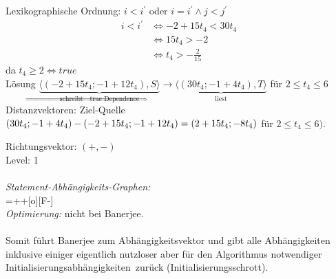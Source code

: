 Lexikographische Ordnung: $i < i^\prime$ oder $i = i^\prime \land j < j^\prime$\\
\begin{equation}
\begin{split}
i<i^\prime &\Leftrightarrow -2+15t_4 < 30t_4\\
           &\Leftrightarrow    15t_4 > -2\\
           &\Leftrightarrow      t_4 >-\frac{2}{15}
\end{split}
\end{equation}
da $t_4 \geq 2 \Leftrightarrow true$\\
Lösung $\underbrace{\langle (-2 + 15t_4; -1+12t_4), S \rangle}_{\text{schreibt} \Rightarrow \text{true Dependence}} \rightarrow
 \underbrace{\langle (30t_4;-1+4t_4), T \rangle}_{\text{liest}}$ für $2 \leq t_4 \leq 6$\\

Distanzvektoren: \glqq Ziel-Quelle\grqq\\
$(30t_4; -1+4t_4) - (-2+15t_4; -1+12t_4) =\\
(2+15t_4; -8t_4)$ für $2\leq t_4 \leq 6)$.

Richtungsvektor: $(+,-)$\\
Level: 1\\
~\\
\textit{Statement-Abhängigkeits-Graphen:}\\

\entrymodifiers={++[o][F-]}
~\\
\textit{Optimierung:} nicht bei Banerjee.\\
~\\
Somit führt Banerjee zum Abhängigkeitsvektor und gibt alle Abhängigkeiten inklusive einiger eigentlich nutzloser aber für den Algorithmus notwendiger \glqq Initialisierungsabhängigkeiten\grqq\ zurück (Initialisierungsschrott).
